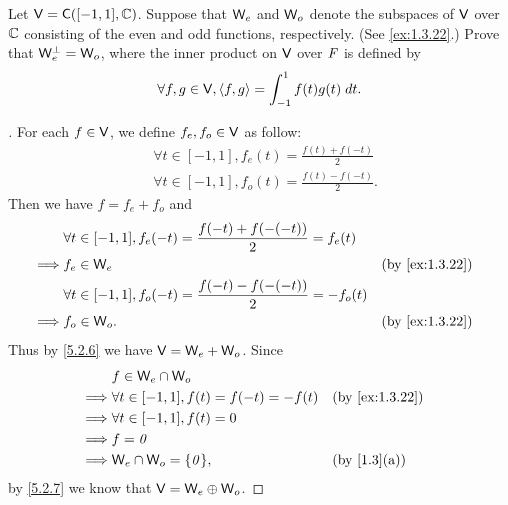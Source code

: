 \begin{ex}\label{ex:6.2.18}
	Let \(\V = \cfs([-1, 1], \C)\).
	Suppose that \(\mathsf{W}_e\) and \(\mathsf{W}_o\) denote the subspaces of \(\mathsf{V}\) over \(\mathbb{C}\) consisting of the even and odd functions, respectively.
	(See \cref{ex:1.3.22}.)
	Prove that \(\mathsf{W}_e^{\perp} = \mathsf{W}_o\), where the inner product on \(\mathsf{V}\) over \(\mathit{F}\) is defined by
	\[
		\forall f, g \in \mathsf{V}, \left\langle f, g\right\rangle = \int_{-1}^1 f(t) g(t) \; dt.
	\]
\end{ex}

\begin{proof}[]
	For each \(f \in \mathsf{V}\), we define \(f_e, f_o \in \mathsf{V}\) as follow:
	\begin{align*}
		 & \forall t \in [-1, 1], f_e(t) = \frac{f(t) + f(-t)}{2}  \\
		 & \forall t \in [-1, 1], f_o(t) = \frac{f(t) - f(-t)}{2}.
	\end{align*}
	Then we have \(f = f_e + f_o\) and
	\begin{align*}
		         & \forall t \in [-1, 1], f_e(-t) = \frac{f(-t) + f(-(-t))}{2} = f_e(t)                      \\
		\implies & f_e \in \W_e                                                          &  & \by{ex:1.3.22} \\
		         & \forall t \in [-1, 1], f_o(-t) = \frac{f(-t) - f(-(-t))}{2} = -f_o(t)                     \\
		\implies & f_o \in \W_o.                                                         &  & \by{ex:1.3.22}
	\end{align*}
	Thus by \cref{5.2.6} we have \(\mathsf{V} = \mathsf{W}_e + \mathsf{W}_o\).
	Since
	\begin{align*}
		         & f \in \W_e \cap \W_o                                            \\
		\implies & \forall t \in [-1, 1], f(t) = f(-t) = -f(t) &  & \by{ex:1.3.22} \\
		\implies & \forall t \in [-1, 1], f(t) = 0                                 \\
		\implies & f = \zv                                                         \\
		\implies & \W_e \cap \W_o = \set{\zv},                 &  & \by{1.3}[a]
	\end{align*}
	by \cref{5.2.7} we know that \(\mathsf{V} = \mathsf{W}_e \oplus \mathsf{W}_o\).


\end{proof}
